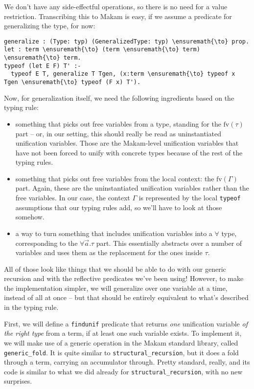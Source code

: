 We don't have any side-effectful operations, so there is no need for a
value restriction. Transcribing this to Makam is easy, if we assume a
predicate for generalizing the type, for now:

\begin{verbatim}
generalize : (Type: typ) (GeneralizedType: typ) \ensuremath{\to} prop.
let : term \ensuremath{\to} (term \ensuremath{\to} term) \ensuremath{\to} term.
typeof (let E F) T' :-
  typeof E T, generalize T Tgen, (x:term \ensuremath{\to} typeof x Tgen \ensuremath{\to} typeof (F x) T').
\end{verbatim}

Now, for generalization itself, we need the following ingredients based
on the typing rule:

\begin{itemize}
\tightlist
\item
  something that picks out free variables from a type, standing for the
  \(\text{fv}(\tau)\) part -- or, in our setting, this should really be
  read as uninstantiated unification variables. Those are the
  Makam-level unification variables that have not been forced to unify
  with concrete types because of the rest of the typing rules.
\item
  something that picks out free variables from the local context: the
  \(\text{fv}(\Gamma)\) part. Again, these are the uninstantiated
  unification variables rather than the free variables. In our case, the
  context \(\Gamma\) is represented by the local \texttt{typeof}
  assumptions that our typing rules add, so we'll have to look at those
  somehow.
\item
  a way to turn something that includes unification variables into a
  \(\forall\) type, corresponding to the \(\forall \vec{a}.\tau\) part.
  This essentially abstracts over a number of variables and uses them as
  the replacement for the ones inside \(\tau\).
\end{itemize}

All of those look like things that we should be able to do with our
generic recursion and with the reflective predicates we've been using!
However, to make the implementation simpler, we will generalize over one
variable at a time, instead of all at once -- but that should be
entirely equivalent to what's described in the typing rule.

First, we will define a \texttt{findunif} predicate that returns
\emph{one} unification variable \emph{of the right type} from a term, if
at least one such variable exists. To implement it, we will make use of
a generic operation in the Makam standard library, called
\texttt{generic\_fold}. It is quite similar to
\texttt{structural\_recursion}, but it does a fold through a term,
carrying an accumulator through. Pretty standard, really, and its code
is similar to what we did already for \texttt{structural\_recursion},
with no new surprises.

